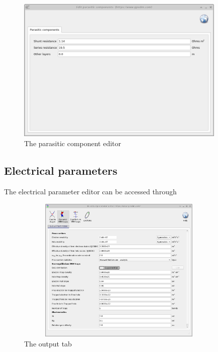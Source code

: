 \begin{figure}[H]
\centering
\includegraphics[width=100mm,height=70mm]{./images/parasitic.png}
\caption{The parasitic component editor}
\label{fig:parasitic}
\end{figure}


\subsection{Electrical parameters}
The electrical parameter editor can be accessed through 

\begin{figure}[H]
\centering
\includegraphics[width=100mm,height=70mm]{./images/dos_editor.png}
\caption{The output tab}
\label{fig:jv_curve}
\end{figure}
